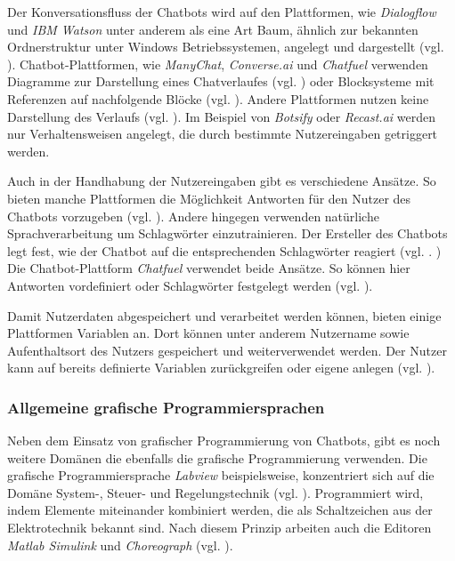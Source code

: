 Der Konversationsfluss der Chatbots wird auf den Plattformen, wie \emph{Dialogflow} und \emph{IBM Watson} unter anderem als eine Art Baum, ähnlich zur bekannten Ordnerstruktur unter Windows Betriebssystemen, angelegt und dargestellt (vgl. \cite{Dialogfl40:online} \cite{KatalogI56:online}). Chatbot-Plattformen, wie \emph{ManyChat}, \emph{Converse.ai} und \emph{Chatfuel} verwenden Diagramme zur Darstellung eines Chatverlaufes (vgl. \cite{Converse15:online} \cite{WelcomeM66:online}) oder Blocksysteme mit Referenzen auf nachfolgende Blöcke (vgl. \cite{Chatfuel3:online}). Andere Plattformen nutzen keine Darstellung des Verlaufs (vgl. \cite{BotsifyC64:online}). Im Beispiel von \emph{Botsify} oder \emph{Recast.ai} werden nur Verhaltensweisen angelegt, die durch bestimmte Nutzereingaben getriggert werden. 

Auch in der Handhabung der Nutzereingaben gibt es verschiedene Ansätze. So bieten manche Plattformen die Möglichkeit Antworten für den Nutzer des Chatbots vorzugeben (vgl. \cite{Chatfuel3:online} \cite{WelcomeM66:online}). Andere hingegen verwenden natürliche Sprachverarbeitung um Schlagwörter einzutrainieren. Der Ersteller des Chatbots legt fest, wie der Chatbot auf die entsprechenden Schlagwörter reagiert (vgl. \cite{BotsifyC64:online}. \cite{Dialogfl40:online} \cite{KatalogI56:online}) Die Chatbot-Plattform \emph{Chatfuel} verwendet beide Ansätze. So können hier Antworten vordefiniert oder Schlagwörter festgelegt werden (vgl. \cite{Chatfuel3:online}). 

Damit Nutzerdaten abgespeichert und verarbeitet werden können, bieten einige Plattformen Variablen an. Dort können unter anderem Nutzername sowie Aufenthaltsort des Nutzers gespeichert und weiterverwendet werden. Der Nutzer kann auf bereits definierte Variablen zurückgreifen oder eigene anlegen (vgl. \cite{Chatfuel3:online} \cite{Converse15:online} \cite{Dialogfl40:online} \cite{KatalogI56:online} \cite{WelcomeM66:online}). 


\subsubsection{Allgemeine grafische Programmiersprachen}

Neben dem Einsatz von grafischer Programmierung von Chatbots, gibt es noch weitere Domänen die ebenfalls die grafische Programmierung verwenden. Die grafische Programmiersprache \emph{Labview} beispielsweise, konzentriert sich auf die Domäne System-, Steuer- und Regelungstechnik (vgl. \cite{WasistLa94:online}). Programmiert wird, indem Elemente miteinander kombiniert werden, die als Schaltzeichen aus der Elektrotechnik bekannt sind. Nach diesem Prinzip arbeiten auch die Editoren \emph{Matlab Simulink} und \emph{Choreograph} (vgl. \cite{Choregra47:online} \cite{Simulink28:online}).

